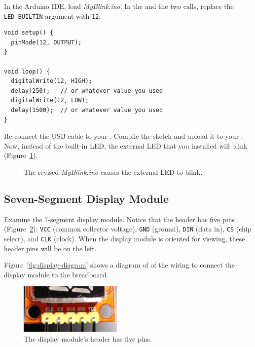 
In the Arduino IDE, load \textit{MyBlink.ino}. In the  and
the two  calls, replace the \lstinline{LED_BUILTIN}
argument with \lstinline{12}:
\begin{lstlisting}
void setup() {
  pinMode(12, OUTPUT);
}

void loop() {
  digitalWrite(12, HIGH);
  delay(250);   // or whatever value you used
  digitalWrite(12, LOW);
  delay(1500);  // or whatever value you used
}
\end{lstlisting}
Re-connect the USB cable to your \nano. Compile the sketch and upload it to
your \nano. Now, instead of the built-in LED, the external LED that you
installed will blink (Figure~\ref{fig:revisedblink}).

\begin{figure}
    \centering
    \caption{The revised \textit{MyBlink.ino} causes the external LED to
        blink.\label{fig:revisedblink}}
\end{figure}

\subsection{Seven-Segment Display Module}

Examine the 7-segment display module. Notice that the header has five pins
(Figure~\ref{fig:display-module-header}): \texttt{VCC} (common collector
voltage), \texttt{GND} (ground), \texttt{DIN} (data in), \texttt{CS} (chip
select), and \texttt{CLK} (clock). When the display module is oriented for
viewing, these header pins will be on the left.

Figure~\ref{fig:display-diagram} shows a diagram of of the wiring to connect
the display module to the breadboard.

\begin{figure}
    \centering
    \includegraphics[width=5cm]{display-module-header}
    \caption{The display module's header has five pins.
        \label{fig:display-module-header}}
\end{figure}

